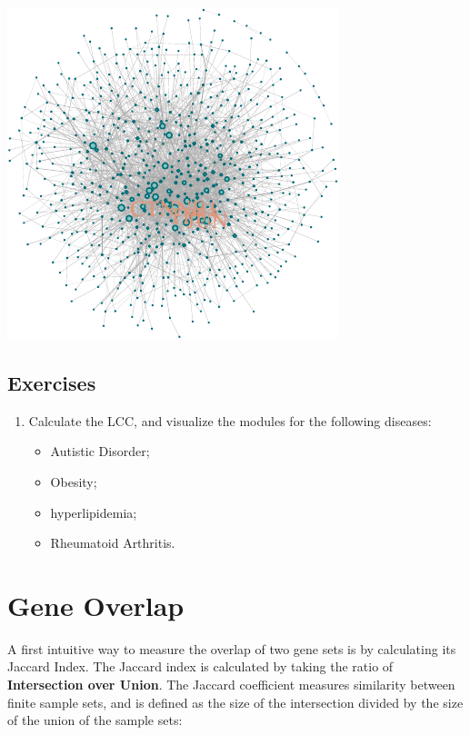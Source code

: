 \documentclass[
]{book}
\providecommand{\tightlist}{%
  \setlength{\itemsep}{0pt}\setlength{\parskip}{0pt}}
\begin{document}
\includegraphics{NetMed_files/figure-latex/unnamed-chunk-25-1.pdf}

\hypertarget{exercises}{%
\subsection{Exercises}\label{exercises}}

\begin{enumerate}
\def\labelenumi{\arabic{enumi}.}
\item
  Calculate the LCC, and visualize the modules for the following diseases:

  \begin{itemize}
  \tightlist
  \item
    Autistic Disorder;
  \item
    Obesity;
  \item
    hyperlipidemia;
  \item
    Rheumatoid Arthritis.
  \end{itemize}
\end{enumerate}

\hypertarget{gene-overlap}{%
\section{Gene Overlap}\label{gene-overlap}}

A first intuitive way to measure the overlap of two gene sets is by calculating its Jaccard Index. The Jaccard index is calculated by taking the ratio of \textbf{Intersection over Union}. The Jaccard coefficient measures similarity between finite sample sets, and is defined as the size of the intersection divided by the size of the union of the sample sets:
\end{document}
